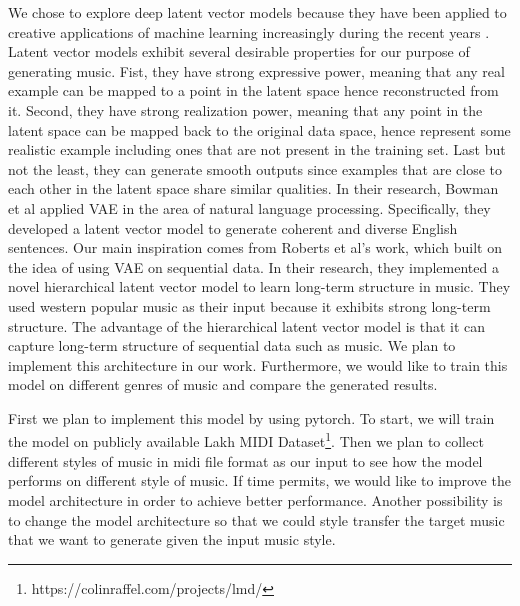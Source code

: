 \documentclass{article}
\begin{document}
We chose to explore deep latent vector models because they have been applied to creative applications of machine learning increasingly during the recent years \cite{carter}\cite{ha}\cite{engel}. Latent vector models exhibit several desirable properties for our purpose of generating music. Fist, they have strong expressive power, meaning that any real example can be mapped to a point in the latent space hence reconstructed from it. Second, they have strong realization power, meaning that any point in the latent space can be mapped back to the original data space, hence represent some realistic example including ones that are not present in the training set. Last but not the least, they can generate smooth outputs since examples that are close to each other in the latent space share similar qualities. In their research, Bowman et al applied VAE in the area of natural language processing\cite{bowman}. Specifically, they developed a latent vector model to generate coherent and diverse English sentences. Our main inspiration comes from Roberts et al's work\cite{roberts}, which built on the idea of using VAE on sequential data. In their research, they implemented a novel hierarchical latent vector model to learn long-term structure in music. They used western popular music as their input because it exhibits strong long-term structure.  The advantage of the hierarchical latent vector model is that it can capture long-term structure of sequential data such as music.
We plan to implement this architecture in our work. Furthermore, we would like to train this model on different genres of music and compare the generated results.

First we plan to implement this model by using pytorch\cite{pytorch}. To start, we will train the model on publicly available Lakh MIDI Dataset\cite{raffel}\footnote{https://colinraffel.com/projects/lmd/}. Then we plan to collect different styles of music in midi file format as our input to see how the model performs on different style of music. If time permits, we would like to improve the model architecture in order to achieve better performance. Another possibility is to change the model architecture so that we could style transfer the target music that we want to generate given the input music style.

\end{document}

